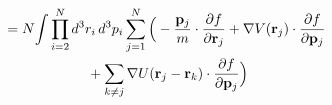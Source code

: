 \documentclass[preview]{standalone}
\begin{document}
\begin{align*}
\special{dvisvgm:raw <g id='unique000'>}&=N\!\int\prod_{i=2}^{N}d^3r_i\,d^3p_i\sum_{j=1}^{N}\Big(-\frac{\va p_j}{m}\cdot\pdv{f}{\va r_j}+\nabla V(\va r_j)\cdot\pdv{f}{\va p_j}\\&\hspace{6em}+\sum_{k\ne j}\nabla U(\va r_j-\va r_k)\cdot\pdv{f}{\va p_j}\Big)\special{dvisvgm:raw </g>}
\end{align*}
\end{document}
